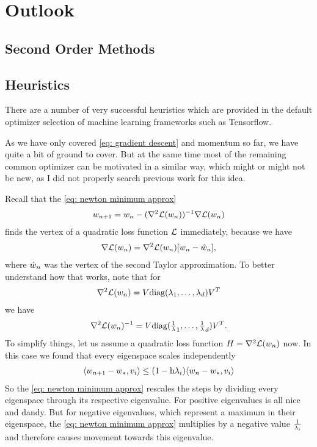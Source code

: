 \chapter{Outlook}

\section{Second Order Methods}

\section{Heuristics}

There are a number of very successful heuristics which are provided in the
default optimizer selection of machine learning frameworks such as Tensorflow.

As we have only covered \ref{eq: gradient descent} and momentum so far, we have
quite a bit of ground to cover. But at the same time most of the remaining
common optimizer \parencite[as reviewed by e.g.][]{ruderOverviewGradientDescent2017}
can be motivated in a similar way, which might or might not be new, as I did not
properly search previous work for this idea.

Recall that the \ref{eq: newton minimum approx}
\begin{align*}
	w_{n+1}	= w_n - (\nabla^2\mathcal{L}(w_n))^{-1}\nabla\mathcal{L}(w_n)
\end{align*}
finds the vertex of a quadratic loss function \(\mathcal{L}\) immediately, because we
have
\begin{align*}
	\nabla\mathcal{L}(w_n) = \nabla^2\mathcal{L}(w_n)[w_n - \hat{w}_n],
\end{align*}
where \(\hat{w}_n\) was the vertex of the second Taylor approximation.
To better understand how that works, note that for
\begin{align*}
	\nabla^2\mathcal{L}(w_n) = V \text{diag}(\lambda_1,\dots,\lambda_d)V^T
\end{align*}
we have
\begin{align*}
	\nabla^2\mathcal{L}(w_n)^{-1}
	= V \text{diag}(\tfrac1{\lambda}_1,\dots,\tfrac1{\lambda}_d)V^T.
\end{align*}
To simplify things, let us assume a quadratic loss function
\(H=\nabla^2\mathcal{L}(w_n)\) now.  In this case we found that every
eigenspace scales independently
\begin{align*}
	\langle w_{n+1} - w_*, v_i \rangle
	\le (1-\text{h} \lambda_i)\langle w_n - w_*, v_i \rangle
\end{align*}
So the \ref{eq: newton minimum approx} rescales the steps by dividing every
eigenspace through its respective eigenvalue. For positive eigenvalues is all
nice and dandy. But for negative eigenvalues, which represent a maximum in their
eigenspace, the \ref{eq: newton minimum approx} multiplies by a negative value
\(\tfrac1{\lambda_i}\) and therefore causes movement towards this eigenvalue.

